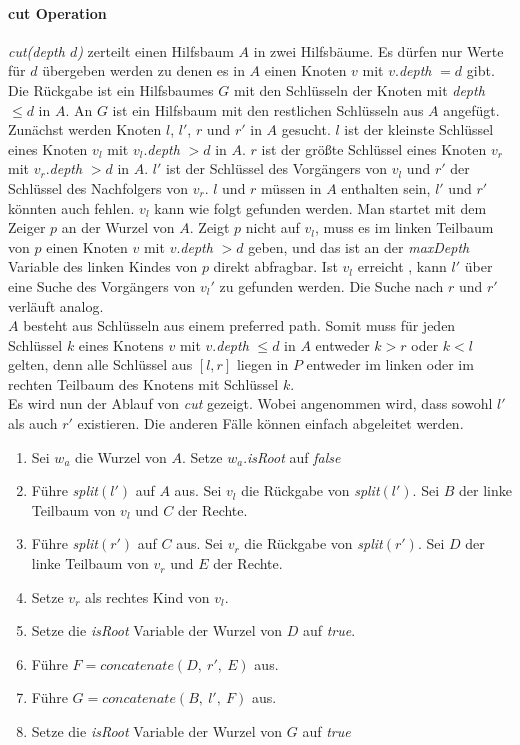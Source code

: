\documentclass[a4paper,12pt]{article}
\begin{document}
\paragraph{cut Operation} \label{cut}

\noindent \textit{cut(depth $d$)} zerteilt einen Hilfsbaum $A$ in zwei Hilfsbäume. Es dürfen nur Werte für $d$ übergeben werden zu denen es in $A$ einen Knoten $v$ mit $v.$\textit{depth} $ = d $ gibt. Die Rückgabe ist ein Hilfsbaumes $G$ mit den Schlüsseln der Knoten mit \textit{depth} $\leq d$ in $A$. An $G$ ist ein Hilfsbaum mit den restlichen Schlüsseln aus $A$ angefügt. Zunächst werden Knoten $l$,  $l'$, $r$ und $r'$ in $A$ gesucht. $l$ ist der kleinste Schlüssel eines Knoten $v_l$ mit $v_l$.\textit{depth} $> d$  in $A$. $r$ ist der größte Schlüssel eines Knoten $v_r$ mit $v_r$.\textit{depth} $> d$  in $A$. $l'$ ist der Schlüssel des Vorgängers von $v_l$ und $r'$ der Schlüssel des Nachfolgers von $v_r$. $l$ und $r$ müssen in $A$ enthalten sein, $l'$ und $r'$ könnten auch fehlen. $v_l$ kann wie folgt gefunden werden. Man startet mit dem Zeiger $p$ an der Wurzel von $A$. Zeigt $p$ nicht auf $v_l$, muss es im linken Teilbaum von $p$ einen Knoten $v$ mit $v$.\textit{depth} $> d$ geben, und das ist an der \textit{maxDepth} Variable des linken Kindes von $p$ direkt abfragbar. Ist $v_l$ erreicht , kann $l'$ über eine Suche des Vorgängers von $v_l'$ zu gefunden werden. Die Suche nach $r$ und $r'$ verläuft analog. \\
$A$ besteht aus Schlüsseln aus einem preferred path. Somit muss für jeden Schlüssel $k$ eines Knotens $v$ mit $v$.\textit{depth} $\leq d$ in $A$ entweder $k > r$ oder $k < l$ gelten, denn alle Schlüssel aus $\left[l,r\right]$ liegen in $P$ entweder im linken oder im rechten Teilbaum des Knotens mit Schlüssel $k$. \\
Es wird nun der Ablauf von \textit{cut} gezeigt. Wobei angenommen wird, dass sowohl $l'$ als auch $r'$ existieren. Die anderen Fälle können einfach abgeleitet werden.
\begin{enumerate}
	\item Sei $w_a$ die Wurzel von $A$. Setze $w_a$.\textit{isRoot} auf \textit{false} 
	\item Führe \textit{split}$\left(l'\right)$ auf $A$ aus. Sei $v_l$ die Rückgabe von \textit{split}$\left(l'\right)$. Sei $B$ der linke Teilbaum von $v_l$ und $C$ der Rechte. 
	\item Führe \textit{split}$\left(r'\right)$ auf $C$ aus. Sei $v_r$ die Rückgabe von \textit{split}$\left(r'\right)$. Sei $D$ der linke Teilbaum von $v_r$ und $E$ der Rechte. 
	\item Setze $v_r$ als rechtes Kind von $v_l$. 
	\item Setze die \textit{isRoot} Variable der Wurzel von $D$ auf \textit{true}.
	\item Führe $F = \textit{concatenate}\left(D, ~ r', ~ E \right)$ aus.
	\item Führe $G = \textit{concatenate}\left(B, ~ l',~ F \right)$ aus.
	\item Setze die \textit{isRoot} Variable der Wurzel von $G$ auf \textit{true} 
\end{enumerate}
\end{document}
